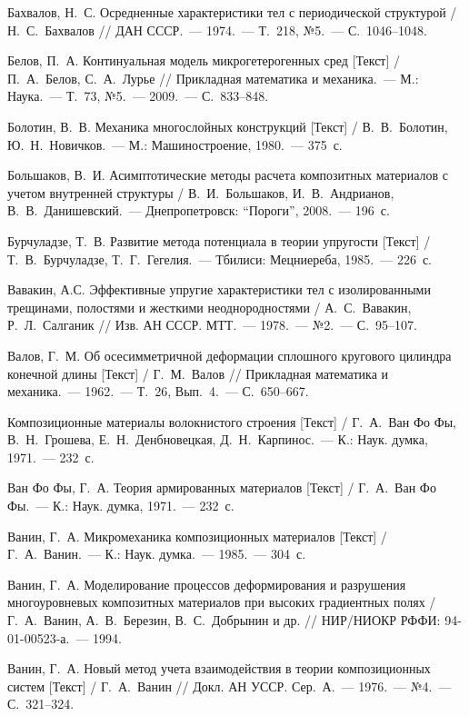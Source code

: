 \begin{biblist}{99}
Бахвалов, Н.~С. 
Осредненные характеристики тел с периодической структурой  
/ Н.~С.~Бахвалов 
// ДАН СССР.~--- 1974.~--- Т.~218, №5.~--- С.~1046--1048.

Белов, П.~А. 
Континуальная модель микрогетерогенных сред [Текст] 
/ П.~А.~Белов, С.~А.~Лурье 
// Прикладная математика и механика.~--- М.: Наука.~--- Т.~73, №5.~--- 2009.~--- С.~833--848.

Болотин, В.~В. 
Механика многослойных конструкций [Текст] 
/ В.~В.~Болотин, Ю.~Н.~Новичков.~--- М.: Машиностроение, 1980.~--- 375~с.

Большаков, В.~И. 
Асимптотические методы расчета композитных материалов с учетом внутренней структуры 
/ В.~И.~Большаков, И.~В.~Андрианов, В.~В.~Данишевский.~--- Днепропетровск: ``Пороги'', 2008.~--- 196~с.

Бурчуладзе, Т.~В. 
Развитие метода потенциала в теории упругости [Текст] 
/ Т.~В.~Бурчуладзе, Т.~Г.~Гегелия.~--- Тбилиси: Мецниереба, 1985.~--- 226~с.

Вавакин, А.С. 
Эффективные упругие характеристики тел с изолированными трещинами, полостями и жесткими неоднородностями  
/ А.~С.~Вавакин, Р.~Л.~Салганик 
// Изв. АН СССР. МТТ.~--- 1978.~--- №2.~--- С.~95--107.

Валов, Г.~М. 
Об осесимметричной деформации сплошного кругового цилиндра конечной длины [Текст] 
/ Г.~М.~Валов 
// Прикладная математика и механика.~--- 1962.~--- Т.~26, Вып.~4.~--- С.~650--667.

Композиционные материалы волокнистого строения [Текст] / Г.~А.~Ван Фо Фы, В.~Н.~Грошева, Е.~Н.~Денбновецкая, Д.~Н.~Карпинос.~--- К.: Наук. думка, 1971.~--- 232~с.

Ван Фо Фы, Г.~А. 
Теория армированных материалов [Текст] 
/ Г.~А.~Ван Фо Фы.~--- К.: Наук. думка, 1971.~--- 232~с.

Ванин, Г.~А.
Микромеханика композиционных материалов [Текст] 
/ Г.~А.~Ванин.~--- К.: Наук. думка.~--- 1985.~--- 304~с.

Ванин, Г.~А. 
Моделирование процессов деформирования и разрушения многоуровневых композитных материалов при высоких градиентных полях 
/ Г.~А.~Ванин, А.~В.~Березин, В.~С.~Добрынин и др. 
// НИР/НИОКР РФФИ: 94-01-00523-а.~--- 1994.

Ванин, Г.~А. 
Новый метод учета взаимодействия в теории композиционных систем [Текст] / Г.~А.~Ванин
// Докл. АН УССР. Сер.~А.~--- 1976.~--- №4.~--- С.~321--324.


\end{biblist}
